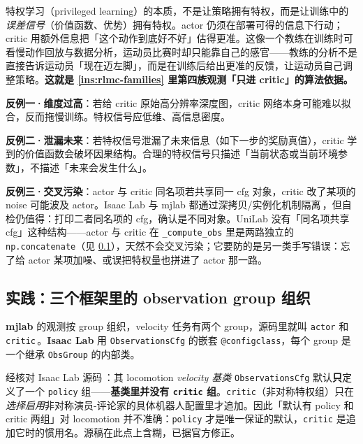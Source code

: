 \begin{insight}\label{ins:rlmc-privileged}
特权学习（privileged learning）的本质，不是让策略拥有特权，而是让训练中的\emph{误差信号}（价值函数、优势）拥有特权。actor 仍须在部署可得的信息下行动；critic 用额外信息把「这个动作到底好不好」估得更准。这像一个教练在训练时可看慢动作回放与数据分析，运动员比赛时却只能靠自己的感官——教练的分析不是直接告诉运动员「现在迈左脚」，而是在训练后给出更准的反馈，让运动员自己调整策略。\textbf{这就是 \cref{ins:rlmc-families} 里第四族观测「只进 critic」的算法依据。}
\end{insight}

\begin{pitfall}
\textbf{反例一·维度过高}：若给 critic 原始高分辨率深度图，critic 网络本身可能难以拟合，反而拖慢训练。特权信号应低维、高信息密度。

\textbf{反例二·泄漏未来}：若特权信号泄漏了未来信息（如下一步的奖励真值），critic 学到的价值函数会破坏因果结构。合理的特权信号只描述「当前状态或当前环境参数」，不描述「未来会发生什么」。

\textbf{反例三·交叉污染}：actor 与 critic 同名项若共享同一 cfg 对象，critic 改了某项的 noise 可能波及 actor。Isaac Lab 与 mjlab 都通过深拷贝/实例化机制隔离\,\cite{isaaclab2024,mjlab2026}，但自检仍值得：打印二者同名项的 cfg，确认是不同对象。UniLab 没有「同名项共享 cfg」这种结构——actor 与 critic 在 \verb|_compute_obs| 里是两路独立的 \verb|np.concatenate|（见 \cref{sec:rlmc-groups}），天然不会交叉污染；它要防的是另一类手写错误：忘了给 actor 某项加噪、或误把特权量也拼进了 actor 那一路。
\end{pitfall}

\subsection{实践：三个框架里的 observation group 组织}
\label{sec:rlmc-groups}

\textbf{mjlab} 的观测按 group 组织，velocity 任务有两个 group，源码里就叫 \verb|actor| 和 \verb|critic|\,\cite{mjlab2026}。\textbf{Isaac Lab} 用 \verb|ObservationsCfg| 的嵌套 \verb|@configclass|，每个 group 是一个继承 \verb|ObsGroup| 的内部类。

\begin{note}
经核对 Isaac Lab 源码\,\cite{isaaclab2024}：其 locomotion \emph{velocity 基类} \verb|ObservationsCfg| 默认\textbf{只}定义了一个 \verb|policy| 组——\textbf{基类里并没有 \texttt{critic} 组}。\verb|critic|（非对称特权组）只在\emph{选择启用}非对称演员-评论家的具体机器人配置里才追加。因此「默认有 policy 和 critic 两组」对 locomotion 并不准确：\verb|policy| 才是唯一保证的默认，\verb|critic| 是追加它时的惯用名。源稿在此点上含糊，已据官方修正。
\end{note}

